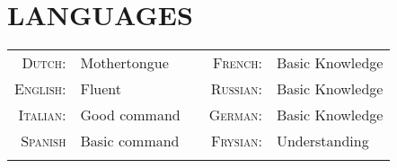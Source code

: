\section{LANGUAGES}

\begin{tabular}{rlcrl}
\textsc{Dutch:} & Mothertongue && \textsc{French:} & Basic Knowledge\\
\textsc{English:} & Fluent && \textsc{Russian:} & Basic Knowledge\\
\textsc{Italian:} & Good command && \textsc{German:} & Basic Knowledge\\
\textsc{Spanish} & Basic command && \textsc{Frysian:} & Understanding\\
&\\
\end{tabular}


